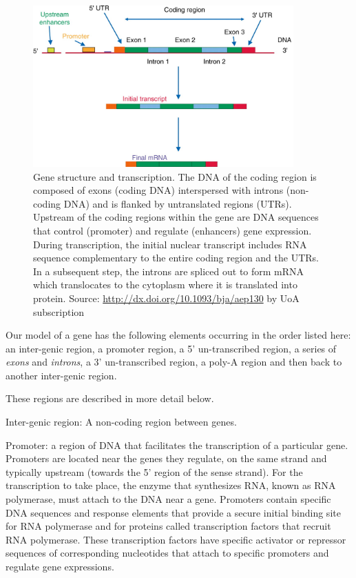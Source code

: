 \documentclass[11pt]{article}
\begin{document}
\begin{figure}[h]
\includegraphics[width=10cm]{figures/genestructure}
\caption{ Gene structure and transcription. The DNA of the coding region is composed of exons (coding DNA) interspersed with introns (non-coding DNA) and is flanked by untranslated regions (UTRs). Upstream of the coding regions within the gene are DNA sequences that control (promoter) and regulate (enhancers) gene expression. During transcription, the initial nuclear transcript includes RNA sequence complementary to the entire coding region and the UTRs. In a subsequent step, the introns are spliced out to form mRNA which translocates to the cytoplasm where it is translated into protein.  Source: \url{http://dx.doi.org/10.1093/bja/aep130} by UoA subscription}
\label{fig:exon}
\end{figure}

Our model of a gene has the following elements occurring in the order listed here: an inter-genic region, a promoter region, a 5' un-transcribed region, a series of {\em exons} and {\em introns}, a 3' un-transcribed region, a poly-A region and then back to another inter-genic region.

These regions are described in more detail below.


Inter-genic region: A non-coding region between genes.

Promoter: a region of DNA that facilitates the transcription of a particular gene. Promoters are located near the genes they regulate, on the same strand and typically upstream (towards the 5' region of the sense strand).
For the transcription to take place, the enzyme that synthesizes RNA, known as RNA polymerase, must attach to the DNA near a gene. Promoters contain specific DNA sequences and response elements that provide a secure initial binding site for RNA polymerase and for proteins called transcription factors that recruit RNA polymerase. These transcription factors have specific activator or repressor sequences of corresponding nucleotides that attach to specific promoters and regulate gene expressions.  
\end{document}
